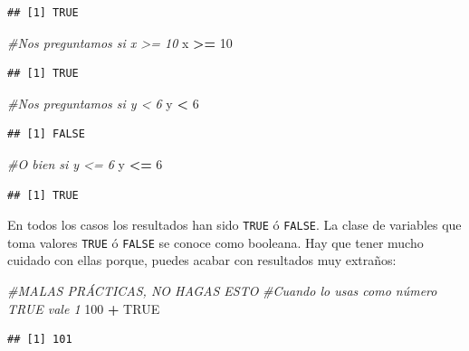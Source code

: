 \documentclass[
]{book}
\newenvironment{Shaded}{\begin{snugshade}}{\end{snugshade}}
\newcommand{\CommentTok}[1]{\textcolor[rgb]{0.56,0.35,0.01}{\textit{#1}}}
\newcommand{\DecValTok}[1]{\textcolor[rgb]{0.00,0.00,0.81}{#1}}
\newcommand{\NormalTok}[1]{#1}
\newcommand{\OperatorTok}[1]{\textcolor[rgb]{0.81,0.36,0.00}{\textbf{#1}}}
\newcommand{\OtherTok}[1]{\textcolor[rgb]{0.56,0.35,0.01}{#1}}
\newcommand{\StringTok}[1]{\textcolor[rgb]{0.31,0.60,0.02}{#1}}
\begin{document}
\begin{verbatim}
## [1] TRUE
\end{verbatim}

\begin{Shaded}
\begin{Highlighting}[]
\CommentTok{#Nos preguntamos si x >= 10}
\NormalTok{x }\OperatorTok{>=}\StringTok{ }\DecValTok{10}
\end{Highlighting}
\end{Shaded}

\begin{verbatim}
## [1] TRUE
\end{verbatim}

\begin{Shaded}
\begin{Highlighting}[]
\CommentTok{#Nos preguntamos si y < 6}
\NormalTok{y }\OperatorTok{<}\StringTok{ }\DecValTok{6}
\end{Highlighting}
\end{Shaded}

\begin{verbatim}
## [1] FALSE
\end{verbatim}

\begin{Shaded}
\begin{Highlighting}[]
\CommentTok{#O bien si y <= 6}
\NormalTok{y }\OperatorTok{<=}\StringTok{ }\DecValTok{6}
\end{Highlighting}
\end{Shaded}

\begin{verbatim}
## [1] TRUE
\end{verbatim}

En todos los casos los resultados han sido \texttt{TRUE} ó \texttt{FALSE}. La clase de variables que toma valores \texttt{TRUE} ó \texttt{FALSE} se conoce como booleana. Hay que tener mucho cuidado con ellas porque, puedes acabar con resultados muy extraños:

\begin{Shaded}
\begin{Highlighting}[]
\CommentTok{#MALAS PRÁCTICAS, NO HAGAS ESTO}
\CommentTok{#Cuando lo usas como número TRUE vale 1}
\DecValTok{100} \OperatorTok{+}\StringTok{ }\OtherTok{TRUE}
\end{Highlighting}
\end{Shaded}

\begin{verbatim}
## [1] 101
\end{verbatim}
\end{document}
